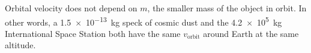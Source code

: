 %    
%  
Orbital velocity does not depend on $m$, the smaller mass of the object in
orbit. In other words, a \SI{1.5e-13}{\kilo\gram} speck of cosmic dust and the
\SI{4.2e5}{\kilo\gram} International Space Station both have the same
$v_\text{orbit}$ around Earth at the same altitude.

